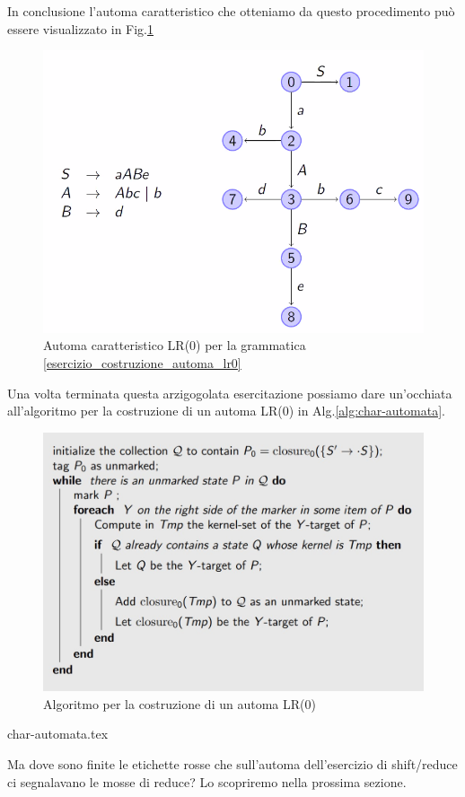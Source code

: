 \documentclass[class=book, crop=false, oneside, 12pt]{standalone}
\begin{document}
In conclusione l'automa caratteristico che otteniamo da questo procedimento può essere visualizzato in Fig.\ref{charateristic-automata_cosntruction}
\begin{figure}
    \centering
    \includegraphics[width=.8\textwidth]{charateristic-automata_cosntruction.png}
    \caption{Automa caratteristico LR(0) per la grammatica \ref{esercizio_costruzione_automa_lr0}}
    \label{charateristic-automata_cosntruction}    
\end{figure}

Una volta terminata questa arzigogolata esercitazione possiamo dare un'occhiata all'algoritmo per la costruzione di un automa LR(0) in Alg.\ref{alg:char-automata}.
\begin{figure}
    \centering
    \includegraphics[width=.8\textwidth]{lr0-automata_construction_algorithm.jpg}
    \caption{Algoritmo per la costruzione di un automa LR(0)}
    \label{lr0-automata_construction_algorithm}    
\end{figure}
{char-automata.tex}

Ma dove sono finite le etichette rosse che sull'automa dell'esercizio di shift/reduce ci segnalavano le mosse di reduce?
Lo scopriremo nella prossima sezione.
\end{document}
